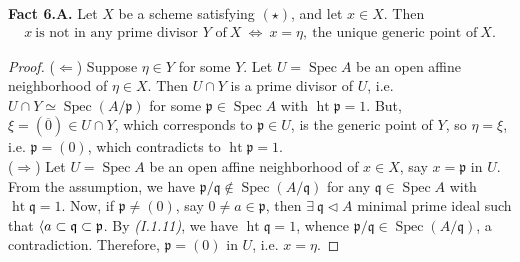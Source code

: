 \documentclass[11pt,a4paper,footinclude=true,headinclude=true]{scrbook} %
\DeclareMathOperator{\Spec}{Spec}
\DeclareMathOperator{\Ht}{ht}
\newcommand{\pp}{\mathfrak{p}}
\newcommand{\qq}{\mathfrak{q}}
\newcommand{\<}{\langle}
\let\>\relax
\newcommand{\>}{\rangle}
\newenvironment{fact}[2][Fact]
    { \begin{mdframed}[backgroundcolor=gray!20] \textbf{#1 #2.} }
    {  \end{mdframed}}
\begin{document}
\begin{fact}{6.A}
    Let $X$ be a scheme satisfying $(\star)$, and let $x\in X$. Then
    \begin{align*}
        x\ \text{is not in any prime divisor $Y$ of}\ X\ \Longleftrightarrow\ x=\eta,\ \text{the unique generic point of}\ X.
    \end{align*}
\end{fact}
\begin{proof}
    ($\Leftarrow$) Suppose $\eta\in Y$ for some $Y$. Let $U=\Spec A$ be an open affine neighborhood of $\eta\in X$. Then $U\cap Y$ is a prime divisor of $U$, i.e. $U\cap Y\simeq\Spec(A/\pp)$ for some $\pp\in\Spec A$ with $\Ht\pp=1$. But, $\xi=(\overline{0})\in U\cap Y$, which corresponds to $\pp\in U$, is the generic point of $Y$, so $\eta=\xi$, i.e. $\pp=(0)$, which contradicts to $\Ht\pp=1$.\\
    
    ($\Rightarrow$) Let $U=\Spec A$ be an open affine neighborhood of $x\in X$, say $x=\pp$ in $U$. From the assumption, we have $\pp/\qq\notin\Spec(A/\qq)$ for any $\qq\in\Spec A$ with $\Ht\qq=1$. Now, if $\pp\neq(0)$, say $0\neq a\in\pp$, then $\exists\ \qq\triangleleft A$ minimal prime ideal such that $\<a\>\subset\qq\subset\pp$. By \textit{(I.1.11)}, we have $\Ht\qq=1$, whence $\pp/\qq\in\Spec(A/\qq)$, a contradiction. Therefore, $\pp=(0)$ in $U$, i.e. $x=\eta$.
\end{proof}
\end{document}
